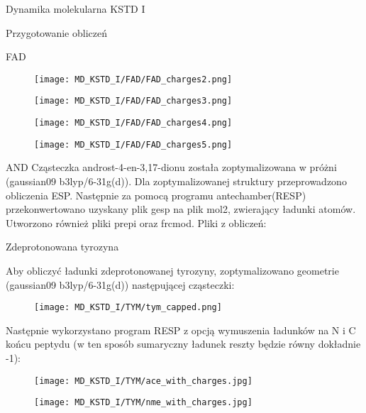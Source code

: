 \begin{section}{Dynamika molekularna KSTD I}
\begin{subsection}{Przygotowanie obliczeń}
\begin{subsubsection}{FAD}
 \begin{figure}[H]
  \texttt{[image: MD\_KSTD\_I/FAD/FAD\_charges2.png]}
\end{figure}

 \begin{figure}[H]
  \texttt{[image: MD\_KSTD\_I/FAD/FAD\_charges3.png]}
\end{figure}

 \begin{figure}[H]
  \texttt{[image: MD\_KSTD\_I/FAD/FAD\_charges4.png]}
\end{figure}

 \begin{figure}[H]
  \texttt{[image: MD\_KSTD\_I/FAD/FAD\_charges5.png]}
\end{figure}
 
\end{subsubsection}

\begin{subsubsection}{AND}
Cząsteczka androst-4-en-3,17-dionu została zoptymalizowana w próżni (gaussian09 b3lyp/6-31g(d)). Dla zoptymalizowanej struktury
przeprowadzono obliczenia ESP. Następnie za pomocą programu antechamber(RESP) przekonwertowano uzyskany plik gesp na plik mol2, zwierający ładunki atomów.
Utworzono również pliki prepi oraz frcmod.
Pliki z obliczeń:

 
\end{subsubsection}

\begin{subsubsection}{Zdeprotonowana tyrozyna}

Aby obliczyć ładunki zdeprotonowanej tyrozyny, zoptymalizowano geometrie (gaussian09 b3lyp/6-31g(d)) następującej cząsteczki:

\begin{figure}[H]
  \texttt{[image: MD\_KSTD\_I/TYM/tym\_capped.png]}
\end{figure}

Następnie wykorzystano program RESP z opcją wymuszenia ładunków na N i C końcu peptydu (w ten sposób sumaryczny ładunek reszty będzie równy dokładnie -1):

\begin{figure}[H]
  \texttt{[image: MD\_KSTD\_I/TYM/ace\_with\_charges.jpg]}
\end{figure}

\begin{figure}[H]
  \texttt{[image: MD\_KSTD\_I/TYM/nme\_with\_charges.jpg]}
\end{figure}


\end{subsubsection}
\end{subsection}
\end{section}
